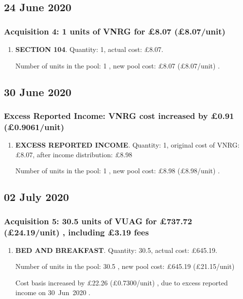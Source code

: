 \documentclass{article}
\begin{document}
\subsection*{24 June 2020}
\subsubsection*{
    Acquisition 4: 1 units of VNRG for £8.07
    (£8.07/unit)%
}

\begin{enumerate}
\item \textbf{SECTION 104}. Quantity: 1,
    actual cost: £8.07.

    Number of units in the pool:
    1%
,
    new pool cost: £8.07
    (£8.07/unit)%
.

\end{enumerate}



\subsection*{30 June 2020}
\subsubsection*{
    Excess Reported Income: VNRG cost increased by £0.91
    (£0.9061/unit)%
}

\begin{enumerate}
\item \textbf{EXCESS REPORTED INCOME}. Quantity: 1,
    original cost of VNRG: £8.07, after income distribution: £8.98%

    Number of units in the pool:
    1%
,
    new pool cost: £8.98
    (£8.98/unit)%
.

\end{enumerate}



\subsection*{02 July 2020}
\subsubsection*{
    Acquisition 5: 30.5 units of VUAG for £737.72
    (£24.19/unit)%
    , including £3.19 fees
}

\begin{enumerate}
\item \textbf{BED AND BREAKFAST}. Quantity: 30.5,
    actual cost: £645.19.

    Number of units in the pool:
    30.5%
,
    new pool cost: £645.19
    (£21.15/unit)%

    Cost basis increased by £22.26
    (£0.7300/unit)%
    , due to excess reported income on \mbox{30 Jun 2020}%
.

\end{enumerate}
\end{document}
